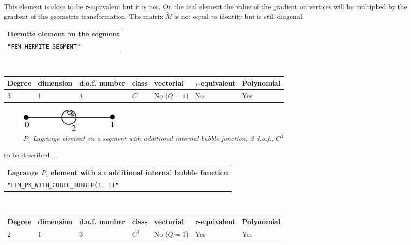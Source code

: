 \documentclass[11pt,a4paper]{article}
\begin{document}
This element is close to be \mbox{$\tau$-equivalent} but it is not. On the real element the value of the gradient on vertices will be multiplied by the gradient of the geometric transformation. The matrix $\tilde{M}$ is not equal to identity but is still diagonal.

\begin{center}
\begin{tabular}{|m{16.11cm}|} \hline 
{\bf Hermite element on the segment}\\
{\tt "FEM\_HERMITE\_SEGMENT"}
\end{tabular} \\ \vspace{-1pt} 
\begin{tabular}{|m{2cm}|m{2cm}|m{2.5cm}|m{1.2cm}|m{2cm}|m{2cm}|m{1.8cm}|} \hline 
Degree & dimension & d.o.f. number & class & vectorial & \mbox{$\tau$-equivalent} & Polynomial\\ \hline
$3$ & $1$ & $4$ & $C^1$ & No \mbox{($Q = 1$)} & No & Yes\\ \hline
\end{tabular}
\end{center}

\begin{figure}[H]
  \begin{center}
    \includegraphics[width=5cm,angle=0]{getfemlist_segment_bubble.eps}
  \end{center}
  \caption{ \it $P_1$ Lagrange element on a segment with additional internal bubble function, 3 d.o.f., $C^0$} 
  \label{fig:segment_bubble}
\end{figure}

to be described ...

\begin{center}
\begin{tabular}{|m{16.11cm}|} \hline 
{ \bf Lagrange $P_1$ element with an additional internal bubble function}\\
{\tt "FEM\_PK\_WITH\_CUBIC\_BUBBLE(1, 1)"} 
\end{tabular} \\ \vspace{-1pt} 
\begin{tabular}{|m{2cm}|m{2cm}|m{2.5cm}|m{1.2cm}|m{2cm}|m{2cm}|m{1.8cm}|} \hline 
Degree & dimension & d.o.f. number & class & vectorial & \mbox{$\tau$-equivalent} & Polynomial\\ \hline
$2$ & $1$ & $3$ & $C^0$ & No \mbox{($Q = 1$)} & Yes & Yes\\ \hline
\end{tabular}
\end{center}
\end{document}
